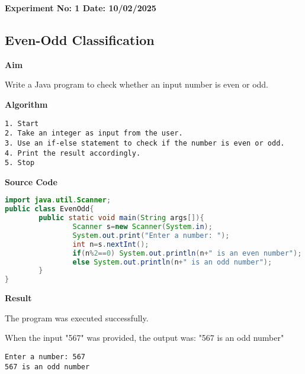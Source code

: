 \textbf{Experiment No: 1 \hfill Date: 10/02/2025}

\begin{center}
    \Large \subsection*{Even-Odd Classification}
\end{center}

\textbf{Aim}
\vspace{0.5cm}

Write a Java program to check whether an input number is even or odd.

\vspace{0.5cm}
\textbf{Algorithm}
\vspace{0.5cm}
\begin{verbatim}
1. Start
2. Take an integer as input from the user.
3. Use an if-else statement to check if the number is even or odd.
4. Print the result accordingly.
5. Stop
\end{verbatim}

\vspace{0.5cm}
\textbf{Source Code}
\begin{lstlisting}[language=Java]
import java.util.Scanner;
public class EvenOdd{
        public static void main(String args[]){
                Scanner s=new Scanner(System.in);
                System.out.print("Enter a number: ");
                int n=s.nextInt();
                if(n%2==0) System.out.println(n+" is an even number");
                else System.out.println(n+" is an odd number");
        }
}
\end{lstlisting}

\vspace{0.5cm}
\textbf{Result}
\vspace{0.5cm}

The program was executed successfully. 

When the input "567" was provided, the output was: "567 is an odd number"
\begin{verbatim}
Enter a number: 567
567 is an odd number
\end{verbatim}

